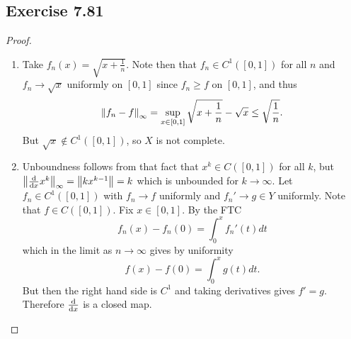 \documentclass[hw_all.tex]{subfiles}
\begin{document}
\subsection{Exercise 7.81}
\begin{proof}
    \begin{enumerate}
        \item 
            Take $f_n(x) = \sqrt{x + \frac{1}{n}}$. Note then that $f_n \in C^1([0,1])$ for all $n$ and $f_n \to \sqrt{x}$ uniformly on $[0,1]$ since $f_n \geq f$ on $[0,1]$, and thus
            \[
                \norm{f_n - f}_{\infty} = \sup_{x \in [0,1]} \sqrt{x + \frac{1}{n}} - \sqrt{x} \leq \sqrt{\frac{1}{n}}
            .\]
            But $\sqrt{x} \notin C^1([0,1])$, so $X$ is not complete.

        \item 
            Unboundness follows from that fact that $x^k \in C([0,1])$ for all $k$, but $\norm{\dv{x} x^k}_{\infty} = \norm{k x^{k-1}} = k$ which is unbounded for $k \to \infty$. Let $f_n \in C^1([0,1])$ with $f_n \to f$ uniformly and $f_n' \to g \in Y$ uniformly. Note that $f \in C([0,1])$. Fix $x \in [0,1]$. By the FTC
            \[
                f_n(x) - f_n(0) = \int_0^x f_n'(t) dt
            \]
            which in the limit as $n \to \infty$ gives by uniformity
            \[
                f(x) - f(0) = \int_0^x g(t) dt
            .\]
            But then the right hand side is $C^1$ and taking derivatives gives $f' = g$. Therefore $\dv{x}$ is a closed map.
    \end{enumerate}
\end{proof}
\end{document}
